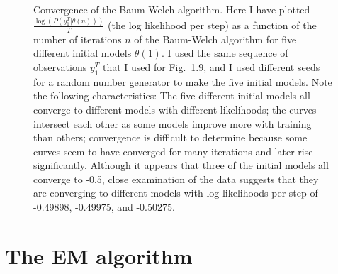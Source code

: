 \documentclass[prelim,showlabels]{book}
\newcommand{\parameters}{\theta}
\newcommand{\ti}[2]{{#1}{(#2)}}                  %
\newcommand{\ts}[3]{#1_{#2}^{#3}}                    %
\newcommand{\plotsize}{\small}
\begin{document}
\begin{figure}
  \centering{\plotsize%
    \def\llps{$\frac{\log \left( P \left(\ts{y}{1}{T}|\ti{\parameters}{n} \right)\right)}{T}$}%
%    
  }
  \caption[Convergence of the Baum-Welch algorithm.]{%
    Convergence of the Baum-Welch algorithm.  Here I have
    plotted $\frac{\log \left( P
        \left(\ts{y}{1}{T}|\ti{\parameters}{n} \right)\right)}{T}$
    (the log likelihood per step) as a function of the number of
    iterations $n$ of the Baum-Welch algorithm for five different
    initial models $\ti{\parameters}{1}$.  I used the same sequence
    of observations $\ts{y}{1}{T}$ that I used for
    Fig.~1.9, and I used different seeds for a
    random number generator to make the five initial models.  Note the
    following characteristics: The five different initial models all
    converge to different models with different likelihoods; the curves
    intersect each other as some models improve more with training
    than others; convergence is difficult to determine because some
    curves seem to have converged for many iterations and later rise
    significantly.  Although it appears that three of the initial
    models all converge to -0.5, close examination of the data
    suggests that they are converging to different models with log
    likelihoods per step of -0.49898, -0.49975, and -0.50275.}
  \label{fig:TrainChar}
\end{figure}

\section{The EM algorithm}
\label{sec:EM}
%
\end{document}

